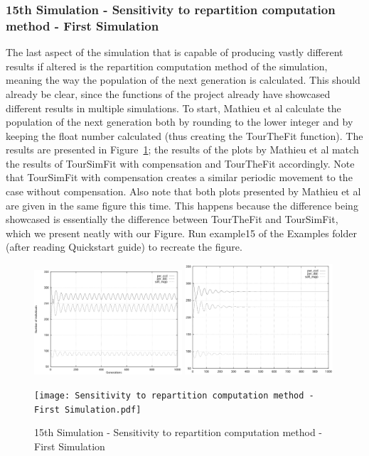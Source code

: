 \subsubsection{15th Simulation - Sensitivity to repartition computation method - First Simulation}
The last aspect of the simulation that is capable of producing vastly different results if altered is the repartition computation method of the simulation, meaning the way the population of the next generation is calculated. This should already be clear, since the functions of the project already have showcased different results in multiple simulations. To start, Mathieu et al calculate the population of the next generation both by rounding to the lower integer and by keeping the float number calculated (thus creating the TourTheFit function). The results are presented in Figure~\ref{fig:Sensitivity to repartition computation method - First Simulation}; the results of the plots by Mathieu et al match the results of TourSimFit with compensation and TourTheFit accordingly. Note that TourSimFit with compensation creates a similar periodic movement to the case without compensation. Also note that both plots presented by Mathieu et al are given in the same figure this time. This happens because the difference being showcased is essentially the difference between TourTheFit and TourSimFit, which we present neatly with our Figure. Run example15 of the Examples folder (after reading Quickstart guide) to recreate the figure.
	\begin{figure}[h]
	    \centering
		\includegraphics[width=0.49\textwidth]{RefPaperFigures/fig11a.jpeg}
		\includegraphics[width=0.49\textwidth]{RefPaperFigures/fig11b.jpeg}\par\vspace{0.5em}\par\vspace{0.5em}
	    \texttt{[image: Sensitivity to repartition computation method - First Simulation.pdf]}
	    \caption{15th Simulation - Sensitivity to repartition computation method - First Simulation}
	    \label{fig:Sensitivity to repartition computation method - First Simulation}
	\end{figure}
